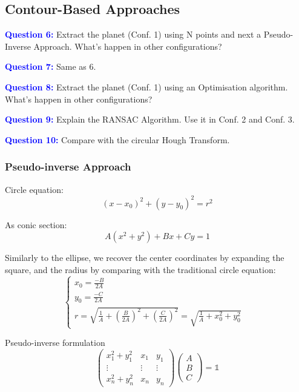 \subsection{Contour-Based Approaches}

\textbf{\textcolor{blue}{Question 6:}} Extract the planet (Conf. 1) using N points and next a Pseudo-Inverse Approach. What’s happen in other configurations?

\textbf{\textcolor{blue}{Question 7:}} Same as 6.

\textbf{\textcolor{blue}{Question 8:}} Extract the planet (Conf. 1) using an Optimisation algorithm. What’s happen in other configurations?

\textbf{\textcolor{blue}{Question 9:}} Explain the RANSAC Algorithm. Use it in Conf. 2 and Conf. 3.

\textbf{\textcolor{blue}{Question 10:}} Compare with the circular Hough Transform.

\subsubsection{Pseudo-inverse Approach}

Circle equation:
\begin{equation}
    (x-x_0)^2 + (y-y_0)^2 = r^2
\end{equation}

As conic section:
\begin{equation}
    A(x^2+y^2) + Bx + Cy = 1
\end{equation}

Similarly to the ellipse, we recover the center coordinates by expanding the square, and the radius  by comparing with the traditional circle equation:
\begin{equation}
    \begin{cases}
        x_0 = \frac{-B}{2A} \\[10pt]
        y_0 = \frac{-C}{2A} \\[10pt]
        r = \sqrt{\frac{1}{A} + \left(\frac{B}{2A}\right)^2 +\left(\frac{C}{2A}\right)^2} = \sqrt{\frac{1}{A} + x_0^2 + y_0^2} &
    \end{cases}
\end{equation}

Pseudo-inverse formulation
\begin{equation}
    \begin{pmatrix}
        x_1^2 + y_1^2 & x_1 & y_1 \\
        \vdots & \vdots & \vdots \\
        x_n^2 + y_n^2 & x_n & y_n 
    \end{pmatrix}
    \begin{pmatrix}
        A \\ B \\ C 
    \end{pmatrix}
    = \mathbb{1}
\end{equation}

